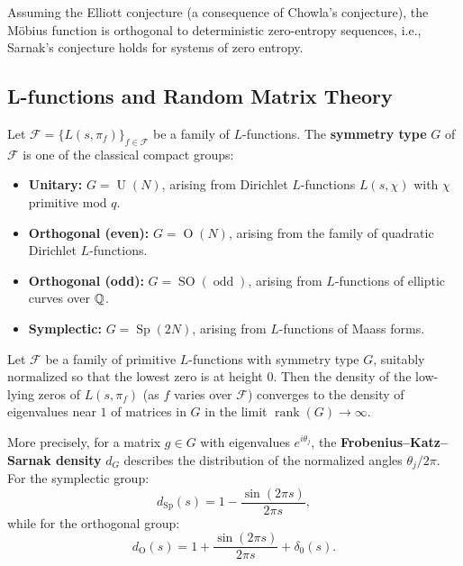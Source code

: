 \begin{theorem}[Tao, 2015]
Assuming the Elliott conjecture (a consequence of Chowla's conjecture), the Möbius function is orthogonal to deterministic zero-entropy sequences, i.e., Sarnak's conjecture holds for systems of zero entropy.
\end{theorem}

\subsection{L-functions and Random Matrix Theory}

\begin{definition}
Let $\mathcal{F} = \{L(s, \pi_f)\}_{f \in \mathcal{F}}$ be a family of $L$-functions. The \textbf{symmetry type} $G$ of $\mathcal{F}$ is one of the classical compact groups:
\begin{itemize}
    \item \textbf{Unitary:} $G = \operatorname{U}(N)$, arising from Dirichlet $L$-functions $L(s, \chi)$ with $\chi$ primitive mod $q$.
    \item \textbf{Orthogonal (even):} $G = \operatorname{O}(N)$, arising from the family of quadratic Dirichlet $L$-functions.
    \item \textbf{Orthogonal (odd):} $G = \operatorname{SO}(\operatorname{odd})$, arising from $L$-functions of elliptic curves over $\mathbb{Q}$.
    \item \textbf{Symplectic:} $G = \operatorname{Sp}(2N)$, arising from $L$-functions of Maass forms.
\end{itemize}
\end{definition}

\begin{theorem}
Let $\mathcal{F}$ be a family of primitive $L$-functions with symmetry type $G$, suitably normalized so that the lowest zero is at height $0$. Then the density of the low-lying zeros of $L(s, \pi_f)$ (as $f$ varies over $\mathcal{F}$) converges to the density of eigenvalues near $1$ of matrices in $G$ in the limit $\operatorname{rank}(G) \to \infty$.
\end{theorem}

More precisely, for a matrix $g \in G$ with eigenvalues $e^{i\theta_j}$, the \textbf{Frobenius--Katz--Sarnak density} $d_G$ describes the distribution of the normalized angles $\theta_j / 2\pi$. For the symplectic group:
\[
d_{\operatorname{Sp}}(s) = 1 - \frac{\sin(2\pi s)}{2\pi s},
\]
while for the orthogonal group:
\[
d_{\operatorname{O}}(s) = 1 + \frac{\sin(2\pi s)}{2\pi s} + \delta_0(s).
\]

